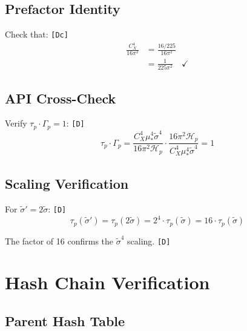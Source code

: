 \documentclass[11pt,a4paper]{article}
\newcommand{\tagD}{\textcolor{green!50!black}{\texttt{[D]}}}
\newcommand{\tagDc}{\textcolor{blue!70!black}{\texttt{[Dc]}}}
\theoremstyle{definition}
\begin{document}
\subsection{Prefactor Identity}
\label{app:pf-ident}

Check that: \tagDc{}
\begin{align}
\label{eq:pf-check-1}
\frac{C_X^4}{16\pi^2} &= \frac{16/225}{16\pi^2} \\
\label{eq:pf-check-2}
&= \frac{1}{225\pi^2} \quad \checkmark
\end{align}

\subsection{API Cross-Check}
\label{app:api-cross}

Verify $\tau_p \cdot \Gamma_p = 1$: \tagD{}
\begin{equation}
\label{eq:api-cross-1}
\tau_p \cdot \Gamma_p = \frac{C_X^4 \mu_*^4 \tilde{\sigma}^4}{16\pi^2 \mathcal{H}_p} \cdot \frac{16\pi^2 \mathcal{H}_p}{C_X^4 \mu_*^4 \tilde{\sigma}^4} = 1
\end{equation}

\subsection{Scaling Verification}
\label{app:scale-verify}

For $\tilde{\sigma}' = 2\tilde{\sigma}$: \tagD{}
\begin{equation}
\label{eq:scale-verify-1}
\tau_p(\tilde{\sigma}') = \tau_p(2\tilde{\sigma}) = 2^4 \cdot \tau_p(\tilde{\sigma}) = 16 \cdot \tau_p(\tilde{\sigma})
\end{equation}

The factor of 16 confirms the $\tilde{\sigma}^4$ scaling. \tagD{}

\section{Hash Chain Verification}
\label{app:hash}

\subsection{Parent Hash Table}
\label{app:parent-hash}
\end{document}

